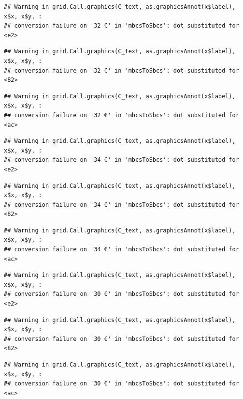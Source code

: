 \documentclass[
]{article}
\begin{document}
\begin{verbatim}
## Warning in grid.Call.graphics(C_text, as.graphicsAnnot(x$label), x$x, x$y, :
## conversion failure on '32 €' in 'mbcsToSbcs': dot substituted for <e2>
\end{verbatim}

\begin{verbatim}
## Warning in grid.Call.graphics(C_text, as.graphicsAnnot(x$label), x$x, x$y, :
## conversion failure on '32 €' in 'mbcsToSbcs': dot substituted for <82>
\end{verbatim}

\begin{verbatim}
## Warning in grid.Call.graphics(C_text, as.graphicsAnnot(x$label), x$x, x$y, :
## conversion failure on '32 €' in 'mbcsToSbcs': dot substituted for <ac>
\end{verbatim}

\begin{verbatim}
## Warning in grid.Call.graphics(C_text, as.graphicsAnnot(x$label), x$x, x$y, :
## conversion failure on '34 €' in 'mbcsToSbcs': dot substituted for <e2>
\end{verbatim}

\begin{verbatim}
## Warning in grid.Call.graphics(C_text, as.graphicsAnnot(x$label), x$x, x$y, :
## conversion failure on '34 €' in 'mbcsToSbcs': dot substituted for <82>
\end{verbatim}

\begin{verbatim}
## Warning in grid.Call.graphics(C_text, as.graphicsAnnot(x$label), x$x, x$y, :
## conversion failure on '34 €' in 'mbcsToSbcs': dot substituted for <ac>
\end{verbatim}

\begin{verbatim}
## Warning in grid.Call.graphics(C_text, as.graphicsAnnot(x$label), x$x, x$y, :
## conversion failure on '30 €' in 'mbcsToSbcs': dot substituted for <e2>
\end{verbatim}

\begin{verbatim}
## Warning in grid.Call.graphics(C_text, as.graphicsAnnot(x$label), x$x, x$y, :
## conversion failure on '30 €' in 'mbcsToSbcs': dot substituted for <82>
\end{verbatim}

\begin{verbatim}
## Warning in grid.Call.graphics(C_text, as.graphicsAnnot(x$label), x$x, x$y, :
## conversion failure on '30 €' in 'mbcsToSbcs': dot substituted for <ac>
\end{verbatim}
\end{document}
